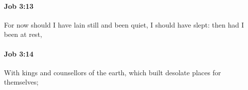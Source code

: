 		\paragraph{Job 3:13} %
			\label{JOB-3-13}

			For now should I have lain still and been quiet, I should have slept: then had I been at rest,


		\paragraph{Job 3:14} %
			\label{JOB-3-14}

			With kings and counsellors of the earth, which built desolate places for themselves;


